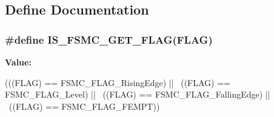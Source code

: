 \subsection{Define Documentation}
\hypertarget{group__FSMC__Flags_gab8674160ef7884f939e07041bbf5b18b}{
\subsubsection[{IS\_\-FSMC\_\-GET\_\-FLAG}]{\setlength{\rightskip}{0pt plus 5cm}\#define IS\_\-FSMC\_\-GET\_\-FLAG(FLAG)}}
\label{group__FSMC__Flags_gab8674160ef7884f939e07041bbf5b18b}
{\bfseries Value:}
\begin{DoxyCode}
(((FLAG) == FSMC_FLAG_RisingEdge) || \
                                ((FLAG) == FSMC_FLAG_Level) || \
                                ((FLAG) == FSMC_FLAG_FallingEdge) || \
                                ((FLAG) == FSMC_FLAG_FEMPT))
\end{DoxyCode}
